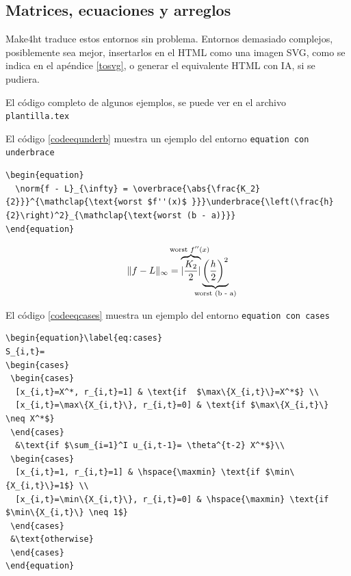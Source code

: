 \documentclass[fleqn,oneside]{article}
\begin{document}
\subsection{Matrices, ecuaciones y arreglos} Make4ht traduce estos entornos sin problema. Entornos demasiado complejos, posiblemente sea mejor, insertarlos en el HTML como una imagen SVG, como se indica en  el apéndice \ref{tosvg}, o generar el equivalente HTML con IA, si se pudiera.


El código completo de  algunos ejemplos,  se puede ver en el archivo \tt{plantilla.tex}

\be
\item El código \ref{codeequnderb} muestra un ejemplo  del entorno \tt{equation}  con \tt{underbrace}


\bigskip\begin{lstlisting}[caption={\tt{equation} con \tt{underbrace}},label={codeequnderb}]
\begin{equation}
  \norm{f - L}_{\infty} = \overbrace{\abs{\frac{K_2}{2}}}^{\mathclap{\text{worst $f''(x)$ }}}\underbrace{\left(\frac{h}{2}\right)^2}_{\mathclap{\text{worst (b - a)}}}
\end{equation}
\end{lstlisting}


\begin{equation}
	\norm{f - L}_{\infty} = \overbrace{\abs{\frac{K_2}{2}}}^{\mathclap{\text{worst $f''(x)$ }}}\underbrace{\left(\frac{h}{2}\right)^2}_{\mathclap{\text{worst (b - a)}}}
\end{equation}


\item[$\bullet$]  El código \ref{codeeqcases} muestra un ejemplo  del entorno \tt{equation}  con \tt{cases}\\


%
\bigskip\begin{lstlisting}[caption={\tt{equation} y \tt{cases}},label={codeeqcases}]
\begin{equation}\label{eq:cases}
S_{i,t}=
\begin{cases}
 \begin{cases}
  [x_{i,t}=X^*, r_{i,t}=1] & \text{if  $\max\{X_{i,t}\}=X^*$} \\
  [x_{i,t}=\max\{X_{i,t}\}, r_{i,t}=0] & \text{if $\max\{X_{i,t}\} \neq X^*$}
 \end{cases}
  &\text{if $\sum_{i=1}^I u_{i,t-1}= \theta^{t-2} X^*$}\\
 \begin{cases}
  [x_{i,t}=1, r_{i,t}=1] & \hspace{\maxmin} \text{if $\min\{X_{i,t}\}=1$} \\
  [x_{i,t}=\min\{X_{i,t}\}, r_{i,t}=0] & \hspace{\maxmin} \text{if $\min\{X_{i,t}\} \neq 1$}
 \end{cases}
 &\text{otherwise}
 \end{cases}
\end{equation}
\end{lstlisting}
%
\end{document}
